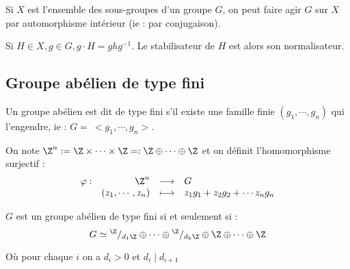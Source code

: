 \begin{example}
 Si $X$ est l'ensemble des sous-groupes d'un groupe $G$, on peut faire agir $G$
sur $X$ par automorphisme intérieur (ie : par conjugaison).

Si $H\in X, g \in G, g\cdotp H = ghg^{-1}$. Le stabilisateur de $H$ est alors
son normalisateur.
\end{example}

\subsection{Groupe abélien de type fini}
\vspace{0.5em}

\begin{defi}

 Un groupe abélien est dit de type fini s'il existe une famille finie
$(g_1,\cdots,g_n)$ qui l'engendre, ie : $G=\ <g_1, \cdots,g_n >$.
\end{defi}

\begin{example}[Remarque]
 On note $\Z^n := \Z \times \cdots \times \Z =: \Z \oplus \cdots \oplus \Z$
et on définit l'homomorphisme surjectif :
\begin{displaymath} \begin{array}{rrcl}
           \varphi :&  \Z^n &\longrightarrow& G \\
         &   (z_1,\cdots,z_n) &\longmapsto& z_1g_1 + z_2g_2 + \cdots z_ng_n  
           \end{array}\end{displaymath}
\end{example}

\begin{theo}

 $G$ est un groupe abélien de type fini si et seulement si :
\begin{displaymath}G \simeq {}^\Z / _{d_1 \Z} \oplus \cdots \oplus
{}^\Z/_{d_k\Z} \oplus \Z \oplus \cdots
\oplus \Z \end{displaymath}

Où pour chaque $i$ on a $d_i > 0$ et $d_i \mid d_{i+1}$
\end{theo}


